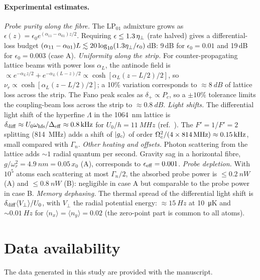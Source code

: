 \documentclass[10pt,twocolumn,a4paper]{article}
\begin{document}
\paragraph{Experimental estimates.}
\emph{Probe purity along the fibre.} The LP$_{01}$ admixture grows as $\epsilon(z)=\epsilon_0e^{(\alpha_{11}-\alpha_{01})z/2}$. Requiring $\epsilon\le1.3\,\eta_{\perp}$ (rate halved) gives a differential-loss budget $(\alpha_{11}-\alpha_{01})L\lesssim20\log_{10}(1.3\eta_{\perp}/\epsilon_0)$\,dB: 9\,dB for $\epsilon_0=0.01$ and 19\,dB for $\epsilon_0=0.003$ (case A).
\emph{Uniformity along the strip.} For counter-propagating lattice beams with power loss $\alpha_L$, the antinode field is $\propto e^{-\alpha_Lz/2}+e^{-\alpha_L(L-z)/2}\propto\cosh[\alpha_L(z-L/2)/2]$, so $\nu_r\propto\cosh[\alpha_L(z-L/2)/2]$; a 10\% variation corresponds to $\approx\SI{8}{dB}$ of lattice loss across the strip. The Fano peak scales as $\delta_+\propto P_c$, so a $\pm10\%$ tolerance limits the coupling-beam loss across the strip to $\approx\SI{0.8}{dB}$.
\emph{Light shifts.} The differential light shift of the hyperfine $\Lambda$ in the \SI{1064}{nm} lattice is $\delta_{\rm diff}\approx U_0\omega_{\rm hfs}/\Delta_{\rm eff}\approx0.8\,\mathrm{kHz}$ for $U_0/h=\SI{11}{MHz}$ (ref.~). The $F'=1$/$F'=2$ splitting (\SI{814}{MHz}) adds a shift of $|g_c\rangle$ of order $\Omega_c^2/(4\times814\,\mathrm{MHz})\approx0.15\,\mathrm{kHz}$, small compared with $\Gamma_n$.
\emph{Other heating and offsets.} Photon scattering from the lattice adds $\sim1$ radial quantum per second. Gravity sag in a horizontal fibre, $g/\omega_r^2=\SI{4.9}{nm}=0.05\,x_0$ (A), corresponds to $\epsilon_{\rm eff}=0.001$.
\emph{Probe depletion.} With $10^5$ atoms each scattering at most $\Gamma_n/2$, the absorbed probe power is $\le\SI{0.2}{nW}$ (A) and $\le\SI{0.8}{nW}$ (B): negligible in case A but comparable to the probe power in case B.
\emph{Memory dephasing.} The thermal spread of the differential light shift is $\delta_{\rm diff}\langle V_\perp\rangle/U_0$, with $V_\perp$ the radial potential energy: $\approx\SI{15}{Hz}$ at \SI{10}{\micro K} and $\sim\SI{0.01}{Hz}$ for $\langle n_x\rangle=\langle n_y\rangle=0.02$ (the zero-point part is common to all atoms).

\section{Data availability}
The data generated in this study are provided with the manuscript. 
\end{document}

